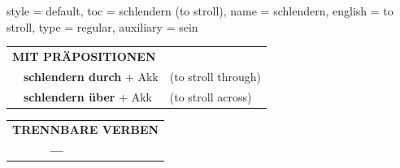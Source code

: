 \begin{verbentry}{
  style = {default},
  toc = {schlendern (to stroll)},
  name = {schlendern},
  english = {to stroll},
  type = {regular},
  auxiliary = {sein}
}
\vspace{10pt}

\begin{tabular}{lll}
\multicolumn{3}{l}{\textbf{MIT PRÄPOSITIONEN}}\\
& \textbf{schlendern durch} + Akk & (to stroll through)\\
& \textbf{schlendern über} + Akk & (to stroll across)\\
\end{tabular}
\hfill
\begin{tabular}{lll}
\multicolumn{3}{l}{\textbf{TRENNBARE VERBEN}}\\
& \textbf{---} & \\
\end{tabular}

\vspace{-5pt}
\end{verbentry}

